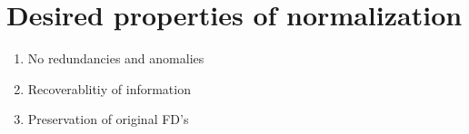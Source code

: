 \section{Desired properties of normalization}
\begin{enumerate}
    
    \item No redundancies and anomalies
    \item Recoverablitiy of information
    \item Preservation of original FD's
\end{enumerate}